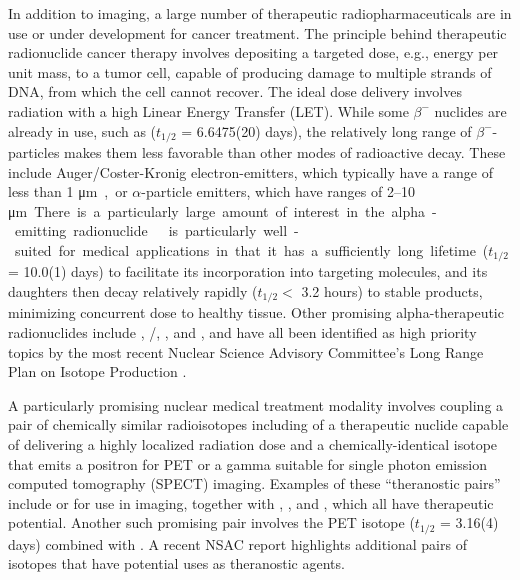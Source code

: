\documentclass[letterpaper]{ar-1col}
\newcommand{\mmicro}{\si\micro}
\begin{document}
In addition to imaging, a large number of therapeutic radiopharmaceuticals are in use or under development for cancer treatment.  The principle behind therapeutic radionuclide cancer therapy involves depositing a targeted dose, e.g., energy per unit mass, to a tumor cell,  capable of producing damage to multiple strands of DNA, from which the cell cannot recover.  The ideal dose delivery involves radiation with a high Linear Energy Transfer (LET).  While some $\beta^-$ nuclides are already in use, such as  ($t_{1/2}$ = 6.6475(20) days), the relatively long range of $\beta^-$-particles makes them less favorable than other modes of radioactive decay.  These include Auger/Coster-Kronig electron-emitters, which typically have a range of less than 1 \mmicro m, or $\alpha$-particle emitters, which have ranges of 2--10 \mmicro m.  

There is a particularly large amount of interest in the alpha-emitting radionuclide .   is particularly well-suited for medical applications in that it has a sufficiently long lifetime ($t_{1/2}$ = 10.0(1) days) to facilitate its incorporation into targeting molecules, and its daughters then decay relatively rapidly ($t_{1/2}<$ 3.2 hours) to stable products, minimizing concurrent dose to healthy tissue. Other promising alpha-therapeutic radionuclides include , /, ,  and , and have all been identified as high priority topics by the most recent Nuclear Science Advisory Committee's Long Range Plan on Isotope Production \cite{NSACIsotopesSubcommittee2015}.

A particularly promising  nuclear medical treatment modality involves coupling a pair of chemically similar radioisotopes including of a therapeutic nuclide capable of delivering a highly localized radiation dose and a chemically-identical isotope that emits a positron for PET or a gamma suitable for single photon emission computed tomography (SPECT) imaging.
Examples of these \enquote{theranostic pairs} include  or  for use in imaging, together with , , and , which all have  therapeutic potential.
Another such promising  pair involves the PET isotope  ($t_{1/2}$ = 3.16(4) days) combined with .  A recent NSAC report \cite{NSACIsotopesSubcommittee2015} highlights additional pairs of isotopes that have potential uses as theranostic agents. 
\end{document}
